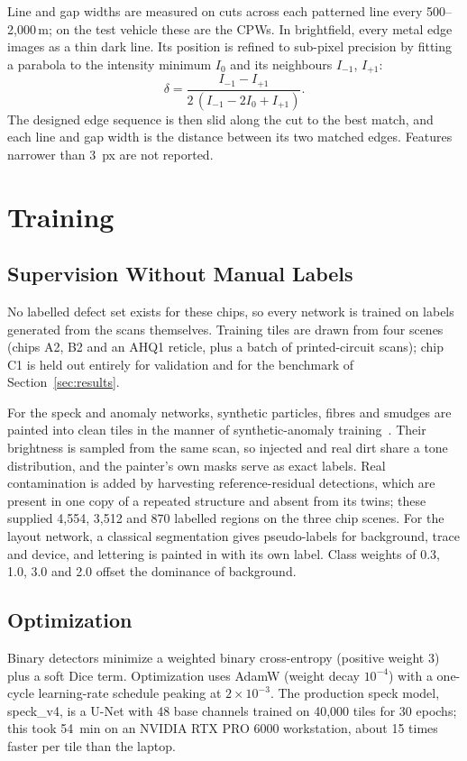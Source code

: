 \documentclass[journal]{IEEEtran}
\newcommand{\um}{\,\textmu m}
\begin{document}
Line and gap widths are measured on cuts across each patterned line every 500--2{,}000\um; on the test vehicle these are the CPWs. In brightfield, every metal edge images as a thin dark line. Its position is refined to sub-pixel precision by fitting a parabola to the intensity minimum $I_0$ and its neighbours $I_{-1}$, $I_{+1}$:
\begin{equation}
\delta = \frac{I_{-1} - I_{+1}}{2\,(I_{-1} - 2 I_0 + I_{+1})}.
\end{equation}
The designed edge sequence is then slid along the cut to the best match, and each line and gap width is the distance between its two matched edges. Features narrower than 3~px are not reported.

\section{Training}\label{sec:training}

\subsection{Supervision Without Manual Labels}
No labelled defect set exists for these chips, so every network is trained on labels generated from the scans themselves. Training tiles are drawn from four scenes (chips A2, B2 and an AHQ1 reticle, plus a batch of printed-circuit scans); chip C1 is held out entirely for validation and for the benchmark of Section~\ref{sec:results}.

For the speck and anomaly networks, synthetic particles, fibres and smudges are painted into clean tiles in the manner of synthetic-anomaly training~\cite{li2021cutpaste,zavrtanik2021draem}. Their brightness is sampled from the same scan, so injected and real dirt share a tone distribution, and the painter's own masks serve as exact labels. Real contamination is added by harvesting reference-residual detections, which are present in one copy of a repeated structure and absent from its twins; these supplied 4{,}554, 3{,}512 and 870 labelled regions on the three chip scenes. For the layout network, a classical segmentation gives pseudo-labels for background, trace and device, and lettering is painted in with its own label. Class weights of 0.3, 1.0, 3.0 and 2.0 offset the dominance of background.

\subsection{Optimization}
Binary detectors minimize a weighted binary cross-entropy (positive weight 3) plus a soft Dice term. Optimization uses AdamW (weight decay $10^{-4}$) with a one-cycle learning-rate schedule peaking at $2 \times 10^{-3}$. The production speck model, speck\_v4, is a U-Net with 48 base channels trained on 40{,}000 tiles for 30 epochs; this took 54~min on an NVIDIA RTX PRO 6000 workstation, about 15 times faster per tile than the laptop.
\end{document}
